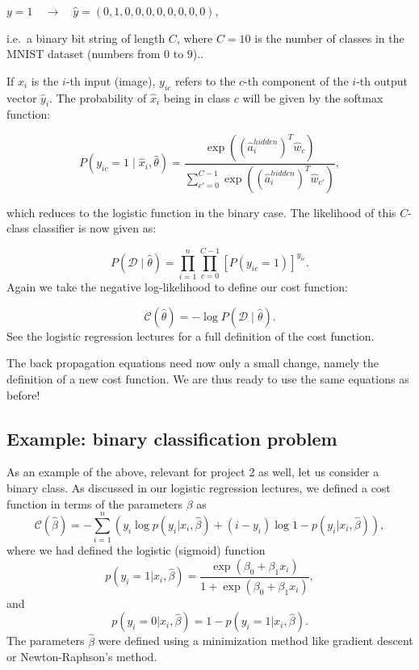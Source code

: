 \documentclass[%
oneside,                 %
final,                   %
10pt]{article}
\begin{document}
$y = 1 \quad \rightarrow \quad \hat{y} = (0, 1, 0, 0, 0, 0, 0, 0, 0, 0) ,$ 


i.e.~a binary bit string of length $C$, where $C = 10$ is the number of classes in the MNIST dataset (numbers from $0$ to $9$)..  

If $\hat{x}_i$ is the $i$-th input (image), $y_{ic}$ refers to the $c$-th component of the $i$-th
output vector $\hat{y}_i$.  
The probability of $\hat{x}_i$ being in class $c$ will be given by the softmax function:  

\[
P(y_{ic} = 1 \mid \hat{x}_i, \hat{\theta}) = \frac{\exp{((\hat{a}_i^{hidden})^T \hat{w}_c)}}
{\sum_{c'=0}^{C-1} \exp{((\hat{a}_i^{hidden})^T \hat{w}_{c'})}} ,
\]

which reduces to the logistic function in the binary case.  
The likelihood of this $C$-class classifier
is now given as:  

\[
P(\mathcal{D} \mid \hat{\theta}) = \prod_{i=1}^n \prod_{c=0}^{C-1} [P(y_{ic} = 1)]^{y_{ic}} .
\]
Again we take the negative log-likelihood to define our cost function:  

\[
\mathcal{C}(\hat{\theta}) = - \log{P(\mathcal{D} \mid \hat{\theta})}.
\]
See the logistic regression lectures for a full definition of the cost function.

The back propagation equations need now only a small change, namely the definition of a new cost function. We are thus ready to use the same equations as before!

\subsection*{Example: binary classification problem}

As an example of the above, relevant for project 2 as well, let us consider a binary class. As discussed in our logistic regression lectures, we defined a cost function in terms of the parameters $\beta$ as
\[
\mathcal{C}(\hat{\beta}) = - \sum_{i=1}^n \left(y_i\log{p(y_i \vert x_i,\hat{\beta})}+(i-y_i)\log{1-p(y_i \vert x_i,\hat{\beta})}\right),
\]
where we had defined the logistic (sigmoid) function
\[
p(y_i =1\vert x_i,\hat{\beta})=\frac{\exp{(\beta_0+\beta_1 x_i)}}{1+\exp{(\beta_0+\beta_1 x_i)}},
\]
and
\[
p(y_i =0\vert x_i,\hat{\beta})=1-p(y_i =1\vert x_i,\hat{\beta}).
\]
The parameters $\hat{\beta}$ were defined using a minimization method like gradient descent or Newton-Raphson's method. 
\end{document}
